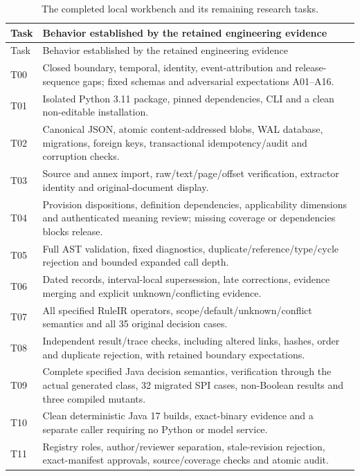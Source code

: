 \begingroup\small
\begin{longtable}{@{}P{0.09\textwidth}P{0.86\textwidth}@{}}
\caption{The completed local workbench and its remaining research tasks.}
\label{tab:executed-tasks}\\
\toprule Task & Behavior established by the retained engineering evidence \\\midrule
\endfirsthead
\toprule Task & Behavior established by the retained engineering evidence \\\midrule
\endhead
T00 & Closed boundary, temporal, identity, event-attribution and release-sequence gaps; fixed schemas and adversarial expectations A01--A16.\\
T01 & Isolated Python 3.11 package, pinned dependencies, CLI and a clean non-editable installation.\\
T02 & Canonical JSON, atomic content-addressed blobs, WAL database, migrations, foreign keys, transactional idempotency/audit and corruption checks.\\
T03 & Source and annex import, raw/text/page/offset verification, extractor identity and original-document display.\\
T04 & Provision dispositions, definition dependencies, applicability dimensions and authenticated meaning review; missing coverage or dependencies blocks release.\\
T05 & Full AST validation, fixed diagnostics, duplicate/reference/type/cycle rejection and bounded expanded call depth.\\
T06 & Dated records, interval-local supersession, late corrections, evidence merging and explicit unknown/conflicting evidence.\\
T07 & All specified RuleIR operators, scope/default/unknown/conflict semantics and all 35 original decision cases.\\
T08 & Independent result/trace checks, including altered links, hashes, order and duplicate rejection, with retained boundary expectations.\\
T09 & Complete specified Java decision semantics, verification through the actual generated class, 32 migrated SPI cases, non-Boolean results and three compiled mutants.\\
T10 & Clean deterministic Java 17 builds, exact-binary evidence and a separate caller requiring no Python or model service.\\
T11 & Registry roles, author/reviewer separation, stale-revision rejection, exact-manifest approvals, source/coverage checks and atomic audit.\\

\end{longtable}
